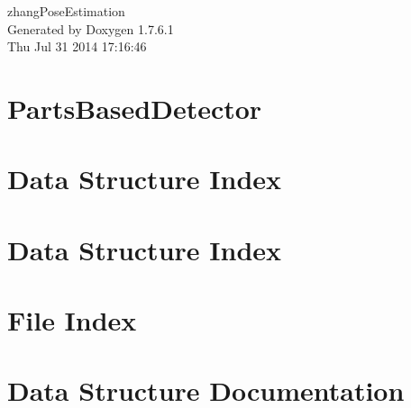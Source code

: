 \documentclass[a4paper]{book}
\begin{document}
\hypersetup{pageanchor=false,citecolor=blue}
\begin{titlepage}
\vspace*{7cm}
\begin{center}
{\Large zhang\-Pose\-Estimation }\\
\vspace*{1cm}
{\large \-Generated by Doxygen 1.7.6.1}\\
\vspace*{0.5cm}
{\small Thu Jul 31 2014 17:16:46}\\
\end{center}
\end{titlepage}
\clearemptydoublepage
{}
\tableofcontents
\clearemptydoublepage
{}
\hypersetup{pageanchor=true,citecolor=blue}
\chapter{\-Parts\-Based\-Detector}
\label{index}\hypertarget{index}{}
\chapter{\-Data \-Structure \-Index}

\chapter{\-Data \-Structure \-Index}

\chapter{\-File \-Index}

\chapter{\-Data \-Structure \-Documentation}

























\end{document}
